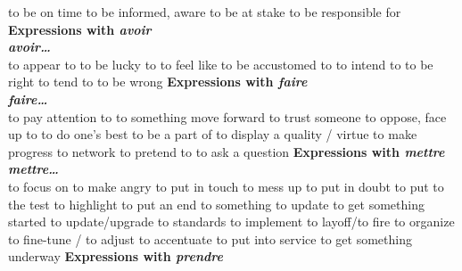    {to be on time}
   {to be informed, aware}
   {to be at stake}
   {to be responsible for}
     {\sffamily\bfseries Expressions with {\em avoir}}\\
               {\bf {\em avoir\ldots}}\\
   {to appear to}
   {to be lucky to}
   {to feel like}
   {to be accustomed to}
   {to intend to}
   {to be right}
   {to tend to}
   {to be wrong}
     {\sffamily\bfseries Expressions with {\em faire}}\\
          {\bf {\em faire\ldots}}\\
   {to pay attention to}
   {to something move forward}
   {to trust someone}
   {to oppose, face up to}
   {to do one’s best} 
   {to be a part of}
   {to display a quality / virtue}
   {to make progress}
   {to network}
   {to pretend to}
   {to ask a question}
     {\sffamily\bfseries Expressions with {\em mettre}}\\
               {\bf {\em mettre\ldots}}\\
   {to focus on}
   {to make angry}
   {to put in touch}
   {to mess up}
   {to put in doubt}
   {to put to the test}
   {to highlight}
   {to put an end to something}
   {to update}
   {to get something started}
 {to update/upgrade to standards}
   {to implement}
   {to layoff/to fire}
   {to organize}
   {to fine-tune / to adjust}
   {to accentuate}
   {to put into service}
   {to get something underway}
     {\sffamily\bfseries Expressions with {\em prendre}}\\
